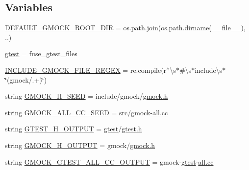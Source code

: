 \subsection*{Variables}
\begin{DoxyCompactItemize}
\item 
\hyperlink{namespacefuse__gmock__files_a900b64b34e20c7430b72252192a3c7ed}{D\+E\+F\+A\+U\+L\+T\+\_\+\+G\+M\+O\+C\+K\+\_\+\+R\+O\+O\+T\+\_\+\+D\+IR} = os.\+path.\+join(os.\+path.\+dirname(\+\_\+\+\_\+file\+\_\+\+\_\+), \textquotesingle{}..\textquotesingle{})
\item 
\hyperlink{namespacefuse__gmock__files_a3fb36dbe8d361f9ecc54e1aa4b94b068}{gtest} = fuse\+\_\+gtest\+\_\+files
\item 
\hyperlink{namespacefuse__gmock__files_aeb4457451f878d6bc8a42f7ff3e5f6cf}{I\+N\+C\+L\+U\+D\+E\+\_\+\+G\+M\+O\+C\+K\+\_\+\+F\+I\+L\+E\+\_\+\+R\+E\+G\+EX} = re.\+compile(r\textquotesingle{}$^\wedge$\textbackslash{}s$\ast$\#\textbackslash{}s$\ast$include\textbackslash{}s$\ast$\char`\"{}(gmock/.+)\char`\"{}\textquotesingle{})
\item 
string \hyperlink{namespacefuse__gmock__files_aa31b816a9048fb3fa9d482eeac69c139}{G\+M\+O\+C\+K\+\_\+\+H\+\_\+\+S\+E\+ED} = \textquotesingle{}include/gmock/\hyperlink{defines__3_8js_ae2a90576a00c74b62070401964c54a5d}{gmock.\+h}\textquotesingle{}
\item 
string \hyperlink{namespacefuse__gmock__files_a518e1f3cc3f184747e6ed3f2d0233c99}{G\+M\+O\+C\+K\+\_\+\+A\+L\+L\+\_\+\+C\+C\+\_\+\+S\+E\+ED} = \textquotesingle{}src/gmock-\/\hyperlink{functions__9_8js_a7cdcac44c024d7db46310842bb60a454}{all.\+cc}\textquotesingle{}
\item 
string \hyperlink{namespacefuse__gmock__files_a385c31d8542b0a2e4b7f46cb2a32d7da}{G\+T\+E\+S\+T\+\_\+\+H\+\_\+\+O\+U\+T\+P\+UT} = \textquotesingle{}\hyperlink{namespacefuse__gmock__files_a3fb36dbe8d361f9ecc54e1aa4b94b068}{gtest}/\hyperlink{defines__3_8js_ae2a90576a00c74b62070401964c54a5d}{gtest.\+h}\textquotesingle{}
\item 
string \hyperlink{namespacefuse__gmock__files_aba0664abeb60f34cfdf59e8475a465d0}{G\+M\+O\+C\+K\+\_\+\+H\+\_\+\+O\+U\+T\+P\+UT} = \textquotesingle{}gmock/\hyperlink{defines__3_8js_ae2a90576a00c74b62070401964c54a5d}{gmock.\+h}\textquotesingle{}
\item 
string \hyperlink{namespacefuse__gmock__files_a9759f3f6c404e3292c26c9317792e846}{G\+M\+O\+C\+K\+\_\+\+G\+T\+E\+S\+T\+\_\+\+A\+L\+L\+\_\+\+C\+C\+\_\+\+O\+U\+T\+P\+UT} = \textquotesingle{}gmock-\/\hyperlink{namespacefuse__gmock__files_a3fb36dbe8d361f9ecc54e1aa4b94b068}{gtest}-\/\hyperlink{functions__9_8js_a7cdcac44c024d7db46310842bb60a454}{all.\+cc}\textquotesingle{}
\end{DoxyCompactItemize}



